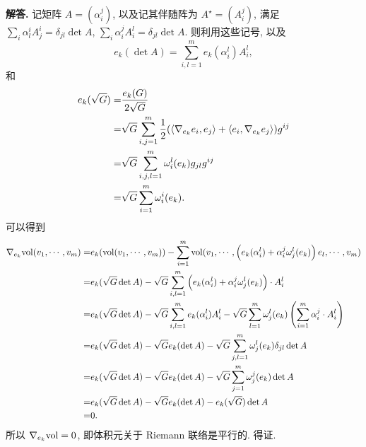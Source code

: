 \documentclass{ctexart}
\newenvironment{solution}{\par\noindent\textbf{解答. }}{\par}
\begin{document}
\begin{solution}
    记矩阵 $A = (\alpha^{j}_{i})$, 以及记其伴随阵为 $A^{\star} = (A^{j}_{i})$, 满足 $\sum_{i}\alpha^{i}_{l}A^{i}_{j} = \delta_{jl}\det A$, $\sum_{i}\alpha^{j}_{i}A^{l}_{i} = \delta_{jl}\det A$. 则利用这些记号, 以及
    \[
        e_k(\det A) = \sum_{i, l = 1}^{m}e_k(\alpha^{l}_{i})A^{l}_{i},
    \]
    和
    \[
        \begin{aligned}
        e_k(\sqrt{G}) 
        =& \frac{e_k(G)}{2\sqrt{G}} \\
        =& \sqrt{G}\sum_{i, j = 1}^{m}\frac{1}{2}(\langle {\nabla_{e_k}e_i}, {e_j} \rangle + \langle {e_i}, {\nabla_{e_k}e_j} \rangle)g^{ij}\\
        =& \sqrt{G}\sum_{i, j, l = 1}^{m}\omega^{l}_{i}(e_k)g_{jl}g^{ij} \\
        =& \sqrt{G}\sum_{i = 1}^{m}\omega^{i}_{i}(e_k).
        \end{aligned}
    \]
    可以得到
    \[
        \begin{aligned}
            \nabla_{e_k}\mathrm{vol}(v_1, \cdots, v_m)
            =& e_k(\mathrm{vol}(v_1, \cdots, v_m)) - \sum_{i = 1}^{m}\mathrm{vol}(v_1, \cdots, \left(e_k(\alpha^{l}_{i}) + \alpha^{j}_{i}\omega^{l}_{j}(e_k)\right)e_l, \cdots, v_m) \\
            =& e_k(\sqrt{G}\det A) - \sqrt{G}\sum_{i, l = 1}^{m}\left(e_k(\alpha^{l}_{i}) + \alpha^{j}_{i}\omega^{l}_{j}(e_k)\right) \cdot A^{l}_{i} \\
            =& e_k(\sqrt{G}\det A) - \sqrt{G}\sum_{i, l = 1}^{m}e_k(\alpha^{l}_{i})A^{l}_{i} - \sqrt{G}\sum_{l = 1}^{m}\omega^{l}_{j}(e_k)\left(\sum_{i = 1}^{m}\alpha^{j}_{i}\cdot A^{l}_{i}\right) \\
            =& e_k(\sqrt{G}\det A) - \sqrt{G}e_k(\det A) - \sqrt{G}\sum_{j, l = 1}^{m}\omega^{l}_{j}(e_k) \delta_{jl} \det A \\
            =& e_k(\sqrt{G}\det A) - \sqrt{G}e_k(\det A) - \sqrt{G}\sum_{j = 1}^{m}\omega^{j}_{j}(e_k) \det A \\
            =& e_k(\sqrt{G}\det A) - \sqrt{G}e_k(\det A) - e_k(\sqrt{G}) \det A \\
            =& 0.
        \end{aligned}
    \]
    所以 $\nabla_{e_k}\mathrm{vol} = 0$, 即体积元关于 Riemann 联络是平行的. 得证.
\end{solution}
\end{document}
